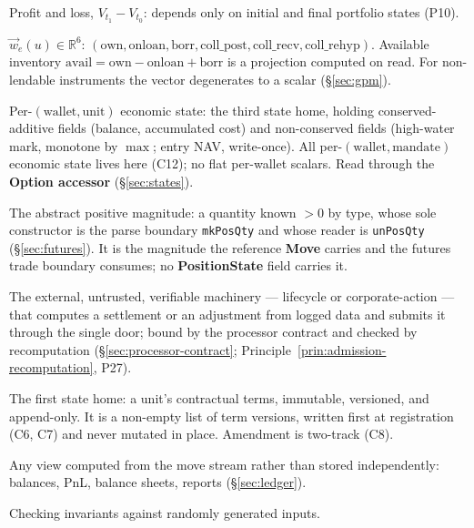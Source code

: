 \begin{description}[style=nextline]
\item[PnL] Profit and loss, $V_{t_1}-V_{t_0}$: depends only on initial and final portfolio states (P10).

\item[Position vector] $\vec{w}_e(u)\in\mathbb{R}^6$: $(\mathrm{own},\mathrm{onloan},\mathrm{borr},\mathrm{coll\_post},\mathrm{coll\_recv},\mathrm{coll\_rehyp})$. Available inventory $\mathrm{avail}=\mathrm{own}-\mathrm{onloan}+\mathrm{borr}$ is a projection computed on read. For non-lendable instruments the vector degenerates to a scalar (\S\ref{sec:gpm}).

\item[PositionState] Per-$(\text{wallet},\text{unit})$ economic state: the third state home, holding conserved-additive fields (balance, accumulated cost) and non-conserved fields (high-water mark, monotone by $\max$; entry NAV, write-once). All per-$(\text{wallet},\text{mandate})$ economic state lives here (C12); no flat per-wallet scalars. Read through the \textbf{Option accessor} (\S\ref{sec:states}).

\item[PosQty] The abstract positive magnitude: a quantity known $>0$ by type, whose sole constructor is the parse boundary \texttt{mkPosQty} and whose reader is \texttt{unPosQty} (\S\ref{sec:futures}). It is the magnitude the reference \textbf{Move} carries and the futures trade boundary consumes; no \textbf{PositionState} field carries it.

\item[Processor] The external, untrusted, verifiable machinery --- lifecycle or corporate-action --- that computes a settlement or an adjustment from logged data and submits it through the single door; bound by the processor contract and checked by recomputation (\S\ref{sec:processor-contract}; Principle~\ref{prin:admission-recomputation}, P27).

\item[ProductTerms] The first state home: a unit's contractual terms, immutable, versioned, and append-only. It is a non-empty list of term versions, written first at registration (C6, C7) and never mutated in place. Amendment is two-track (C8).

\item[Projection] Any view computed from the move stream rather than stored independently: balances, PnL, balance sheets, reports (\S\ref{sec:ledger}).

\item[Property-based testing] Checking invariants against randomly generated inputs.


\end{description}
